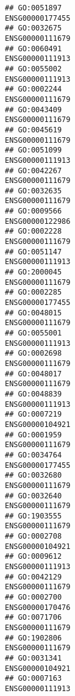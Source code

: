 \documentclass[
]{article}
\begin{document}
\begin{verbatim}
## GO:0051897                                                 ENSG00000177455
## GO:0032675                                                 ENSG00000111679
## GO:0060491                                                 ENSG00000111913
## GO:0055002                                                 ENSG00000111913
## GO:0002244                                                 ENSG00000111679
## GO:0043409                                                 ENSG00000111679
## GO:0045619                                                 ENSG00000111679
## GO:0051099                                                 ENSG00000111913
## GO:0042267                                                 ENSG00000111679
## GO:0032635                                                 ENSG00000111679
## GO:0009566                                                 ENSG00000122986
## GO:0002228                                                 ENSG00000111679
## GO:0051147                                                 ENSG00000111913
## GO:2000045                                                 ENSG00000111679
## GO:0002285                                                 ENSG00000177455
## GO:0048015                                                 ENSG00000111679
## GO:0055001                                                 ENSG00000111913
## GO:0002698                                                 ENSG00000111679
## GO:0048017                                                 ENSG00000111679
## GO:0048839                                                 ENSG00000111913
## GO:0007219                                                 ENSG00000104921
## GO:0001959                                                 ENSG00000111679
## GO:0034764                                                 ENSG00000177455
## GO:0032680                                                 ENSG00000111679
## GO:0032640                                                 ENSG00000111679
## GO:1903555                                                 ENSG00000111679
## GO:0002708                                                 ENSG00000104921
## GO:0009612                                                 ENSG00000111913
## GO:0042129                                                 ENSG00000111679
## GO:0002700                                                 ENSG00000170476
## GO:0071706                                                 ENSG00000111679
## GO:1902806                                                 ENSG00000111679
## GO:0031341                                                 ENSG00000104921
## GO:0007163                                                 ENSG00000111913

\end{verbatim}
\end{document}
